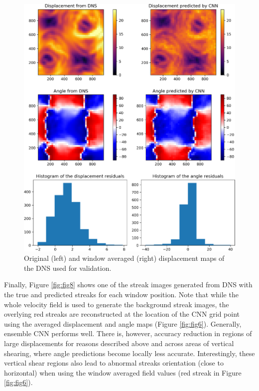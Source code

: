 \documentclass{svjour3}                     %
\begin{document}
\begin{figure}
\includegraphics[width=\textwidth]{figs/figure6.png}
\caption{Original (left) and window averaged (right) displacement maps of the DNS \cite{plumley2016effects} used for validation.}
\label{fig:fig7}
\end{figure}

Finally, Figure \ref{fig:fig8} shows one of the streak images generated from DNS with the true and predicted streaks for each window position. Note that while the whole velocity field is used to generate the background streak images, the overlying red streaks are reconstructed at the location of the CNN grid point using the averaged displacement and angle maps (Figure \ref{fig:fig6}). Generally, ensemble CNN performs well. There is, however, accuracy reduction in regions of large displacements for reasons described above and across areas of vertical shearing, where angle predictions become locally less accurate. Interestingly, these vertical shear regions also lead to abnormal streaks orientation (close to horizontal) when using the window averaged field values (red streak in Figure \ref{fig:fig6}).
\end{document}
